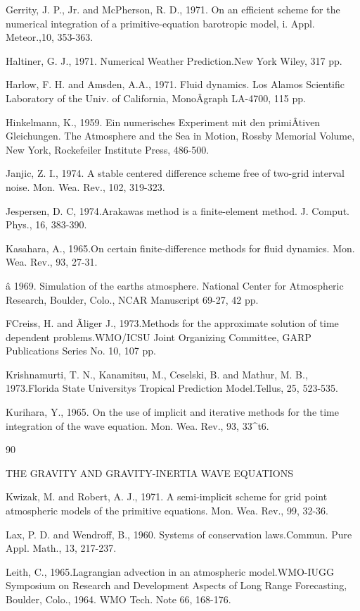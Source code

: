 Gerrity, J. P., Jr. and McPherson, R. D., 1971. On an efficient scheme
for the numerical integration of a primitive-equation barotropic model,
i. Appl. Meteor.,10, 353-363.

Haltiner, G. J., 1971. Numerical Weather Prediction.New York Wiley, 317
pp.

Harlow, F. H. and Amsden, A.A., 1971. Fluid dynamics. Los Alamos
Scientific Laboratory of the Univ. of California, MonoÂ­graph LA-4700,
115 pp.

Hinkelmann, K., 1959. Ein numerisches Experiment mit den primiÂ­tiven
Gleichungen. The Atmosphere and the Sea in Motion, Rossby Memorial
Volume, New York, Rockefeiler Institute Press, 486-500.

Janjic, Z. I., 1974. A stable centered difference scheme free of
two-grid interval noise. Mon. Wea. Rev., 102, 319-323.

Jespersen, D. C, 1974.Arakawa\textquotesingle s method is a
finite-element method. J. Comput. Phys., 16, 383-390.

Kasahara, A., 1965.On certain finite-difference methods for fluid
dynamics. Mon. Wea. Rev., 93, 27-31.

â 1969. Simulation of the earth\textquotesingle s atmosphere. National
Center for Atmospheric Research, Boulder, Colo., NCAR Manuscript 69-27,
42 pp.

FCreiss, H. and Ãliger J., 1973.Methods for the approximate solution of
time dependent problems.WMO/ICSU Joint Organizing Committee, GARP
Publications Series No. 10, 107 pp.

Krishnamurti, T. N., Kanamitsu, M., Ceselski, B. and Mathur, M. B.,
1973.Florida State University\textquotesingle s Tropical Prediction
Model.Tellus, 25, 523-535.

Kurihara, Y., 1965. On the use of implicit and iterative methods for the
time integration of the wave equation. Mon. Wea. Rev., 93, 33\^{}t6.

90

THE GRAVITY AND GRAVITY-INERTIA WAVE EQUATIONS

Kwizak, M. and Robert, A. J., 1971. A semi-implicit scheme for grid
point atmospheric models of the primitive equations. Mon. Wea. Rev., 99,
32-36.

Lax, P. D. and Wendroff, B., 1960. Systems of conservation laws.Commun.
Pure Appl. Math., 13, 217-237.

Leith, C., 1965.Lagrangian advection in an atmospheric model.WMO-IUGG
Symposium on Research and Development Aspects of Long Range Forecasting,
Boulder, Colo., 1964. WMO Tech. Note 66, 168-176.

